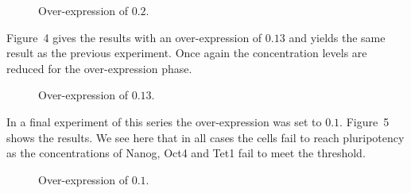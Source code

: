 \begin{figure}
\centering
\begin{minipage}[t]{0.3\textwidth}
\centering
\graphicspath{{../Plots/}}

\end{minipage}
\hfill
\begin{minipage}[t]{0.3\textwidth}
\centering
\graphicspath{{../Plots/}}

\end{minipage}
\hspace*{0.2cm}
\begin{minipage}[t]{0.3\textwidth}
\centering
\graphicspath{{../Plots/}}

\end{minipage}
\caption{Over-expression of $0.2$.}
\label{pl:NOT_0.2}
\end{figure}

Figure~4 gives the results with an over-expression of $0.13$ and yields the same result as the previous
experiment. Once again the concentration levels are reduced for the over-expression phase.

\begin{figure}
\centering
\begin{minipage}[t]{0.3\textwidth}
\centering
\graphicspath{{../Plots/}}

\end{minipage}
\hfill
\begin{minipage}[t]{0.3\textwidth}
\centering
\graphicspath{{../Plots/}}

\end{minipage}
\hspace*{0.2cm}
\begin{minipage}[t]{0.3\textwidth}
\centering
\graphicspath{{../Plots/}}

\end{minipage}
\caption{Over-expression of $0.13$.}
\label{pl:NOT_0.13}
\end{figure}

In a final experiment of this series the over-expression was set to $0.1$. Figure~5 shows 
the results. We see here that in all cases the cells fail to reach pluripotency as the 
concentrations of Nanog, Oct4 and Tet1 fail to meet the threshold.

\begin{figure}
\centering
\begin{minipage}[t]{0.3\textwidth}
\centering
\graphicspath{{../Plots/}}

\end{minipage}
\hfill
\begin{minipage}[t]{0.3\textwidth}
\centering
\graphicspath{{../Plots/}}

\end{minipage}
\hspace*{0.2cm}
\begin{minipage}[t]{0.3\textwidth}
\centering
\graphicspath{{../Plots/}}

\end{minipage}
\caption{Over-expression of $0.1$.}
\label{pl:NOT_0.1}
\end{figure}

